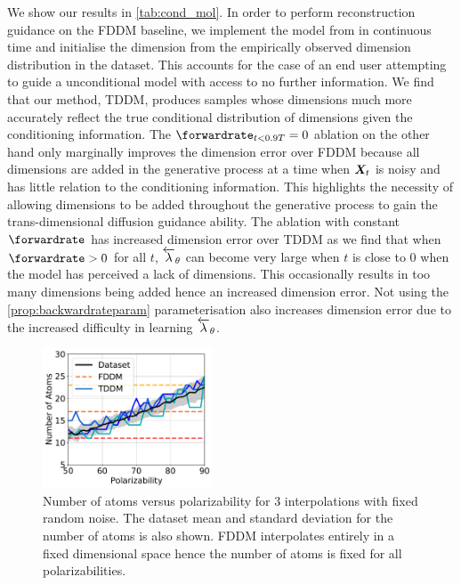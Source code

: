 We show our results in \cref{tab:cond_mol}. In order to perform reconstruction guidance on the FDDM baseline, we implement the model from \cite{hoogeboom2022equivariant} in continuous time and initialise the dimension from the empirically observed dimension distribution in the dataset.  This accounts for the case of an end user attempting to guide a unconditional model with access to no further information. We find that our method, TDDM, produces samples whose dimensions much more accurately reflect the true conditional distribution of dimensions given the conditioning information.
The $\forwardrate_{t<0.9T} = 0$ ablation on the other hand only marginally improves the dimension error over FDDM because all dimensions are added in the generative process at a time when ${\bm{X}}_t$ is noisy and has little relation to the conditioning information. This highlights the necessity of allowing dimensions to be added throughout the generative process to gain the trans-dimensional diffusion guidance ability. The ablation with constant $\forwardrate$ has increased dimension error over TDDM as we find that when $\forwardrate > 0$ for all $t$, $\overleftarrow{\lambda}_\theta$ can become very large when $t$ is close to 0 when the model has perceived a lack of dimensions. This occasionally results in too many dimensions being added hence an increased dimension error. Not using the \cref{prop:backwardrateparam} parameterisation also increases dimension error due to the increased difficulty in learning $\overleftarrow{\lambda}_\theta$.

\begin{figure}[t]
    \centering
    \includegraphics[width=0.45\textwidth]{figs/tddm/polarizability_vs_num_atoms.pdf}
    \caption{Number of atoms versus polarizability for $3$ interpolations with fixed random noise. The dataset mean and standard deviation for the number of atoms is also shown. FDDM interpolates entirely in a fixed dimensional space hence the number of atoms is fixed for all polarizabilities.}
    \label{fig:tddm-interp_plot}
\end{figure}

